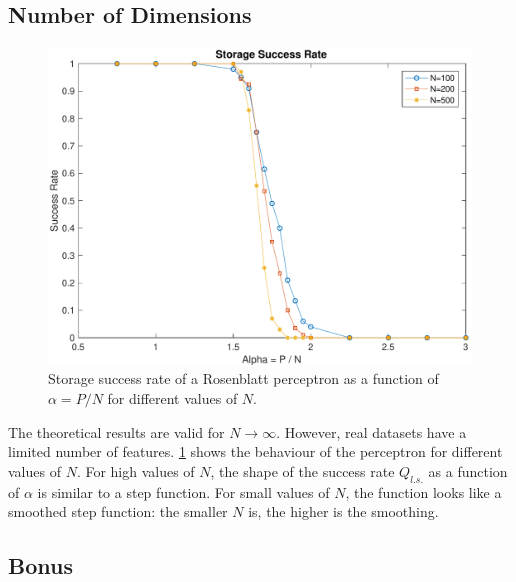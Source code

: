 \subsection{Number of Dimensions}
\label{subsec:dimensions}
\begin{figure}[t]
	\centering
	\includegraphics[width=\columnwidth]{figures/multiple_n}
    \caption{Storage success rate of a Rosenblatt perceptron as a function of $\alpha = P / N$ for different values of $N$.}
	\label{fig:multiple_n}
\end{figure}

The theoretical results are valid for $N \to \infty$.
However, real datasets have a limited number of features.
\cref{fig:multiple_n} shows the behaviour of the perceptron for different values of $N$.
For high values of $N$, the shape of the success rate $Q_{l.s.}$ as a function of $\alpha$ is similar to a step function.
For small values of $N$, the function looks like a smoothed step function:
the smaller $N$ is, the higher is the smoothing.

\subsection{Bonus}
